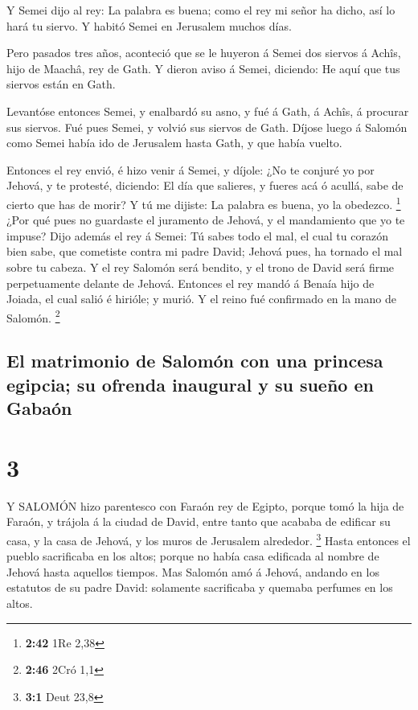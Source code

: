  Y Semei dijo al rey: La palabra es buena; como el rey mi
señor ha dicho, así lo hará tu siervo. Y habitó Semei en Jerusalem
muchos días.

 Pero pasados tres años, aconteció que se le huyeron á
Semei dos siervos á Achîs, hijo de Maachâ, rey de Gath. Y dieron aviso á
Semei, diciendo: He aquí que tus siervos están en Gath.

 Levantóse entonces Semei, y enalbardó su asno, y fué á
Gath, á Achîs, á procurar sus siervos. Fué pues Semei, y volvió sus
siervos de Gath.  Díjose luego á Salomón como Semei había
ido de Jerusalem hasta Gath, y que había vuelto.

 Entonces el rey envió, é hizo venir á Semei, y díjole: ¿No
te conjuré yo por Jehová, y te protesté, diciendo: El día que salieres,
y fueres acá ó acullá, sabe de cierto que has de morir? Y tú me dijiste:
La palabra es buena, yo la obedezco. \footnote{\textbf{2:42} 1Re 2,38}
 ¿Por qué pues no guardaste el juramento de Jehová, y el
mandamiento que yo te impuse?  Dijo además el rey á Semei:
Tú sabes todo el mal, el cual tu corazón bien sabe, que cometiste contra
mi padre David; Jehová pues, ha tornado el mal sobre tu cabeza.
 Y el rey Salomón será bendito, y el trono de David será
firme perpetuamente delante de Jehová.  Entonces el rey
mandó á Benaía hijo de Joiada, el cual salió é hirióle; y murió. Y el
reino fué confirmado en la mano de Salomón. \footnote{\textbf{2:46} 2Cró
  1,1}

\hypertarget{el-matrimonio-de-salomuxf3n-con-una-princesa-egipcia-su-ofrenda-inaugural-y-su-sueuxf1o-en-gabauxf3n}{%
\subsection{El matrimonio de Salomón con una princesa egipcia; su
ofrenda inaugural y su sueño en
Gabaón}\label{el-matrimonio-de-salomuxf3n-con-una-princesa-egipcia-su-ofrenda-inaugural-y-su-sueuxf1o-en-gabauxf3n}}

\hypertarget{section-2}{%
\section{3}\label{section-2}}

 Y SALOMÓN hizo parentesco con Faraón rey de Egipto, porque
tomó la hija de Faraón, y trájola á la ciudad de David, entre tanto que
acababa de edificar su casa, y la casa de Jehová, y los muros de
Jerusalem alrededor. \footnote{\textbf{3:1} Deut 23,8} 
Hasta entonces el pueblo sacrificaba en los altos; porque no había casa
edificada al nombre de Jehová hasta aquellos tiempos.  Mas
Salomón amó á Jehová, andando en los estatutos de su padre David:
solamente sacrificaba y quemaba perfumes en los altos.

